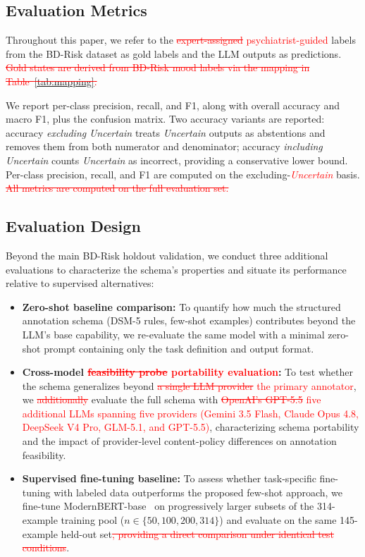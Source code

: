 \documentclass[runningheads]{llncs}
\newcommand{\rev}[1]{\textcolor{red}{#1}}
\newcommand{\del}[1]{\textcolor{red}{\sout{#1}}}
\newcommand{\rev}[1]{#1}
\newcommand{\del}[1]{}
\begin{document}
\subsection{Evaluation Metrics}
\label{sec:metrics}

Throughout this paper, we refer to the \del{expert-assigned} \rev{psychiatrist-guided} labels from the BD-Risk dataset as gold labels and the LLM outputs as predictions.\del{ Gold states are derived from BD-Risk mood labels via the mapping in Table~\ref{tab:mapping}.}

We report per-class precision, recall, and F1, along with overall accuracy and macro F1, plus the confusion matrix. Two accuracy variants are reported: accuracy \emph{excluding} \emph{Uncertain} treats \emph{Uncertain} outputs as abstentions and removes them from both numerator and denominator; accuracy \emph{including} \emph{Uncertain} counts \emph{Uncertain} as incorrect, providing a conservative lower bound. Per-class precision, recall, and F1 are computed on the excluding-\rev{\emph{Uncertain}} basis.\del{ All metrics are computed on the full evaluation set.}

\subsection{Evaluation Design}
\label{sec:evaldesign}

Beyond the main BD-Risk holdout validation, we conduct three additional evaluations to characterize the schema's properties and situate its performance relative to supervised alternatives:

\begin{itemize}
\item \textbf{Zero-shot baseline comparison:} To quantify how much the structured annotation schema (DSM-5 rules, few-shot examples) contributes beyond the LLM's base capability, we re-evaluate the same model with a minimal zero-shot prompt containing only the task definition and output format.
\item \textbf{Cross-model \del{feasibility probe} \rev{portability evaluation}:} To test whether the schema generalizes beyond \del{a single LLM provider} \rev{the primary annotator}, we \del{additionally} evaluate the full schema with \del{OpenAI's GPT-5.5} \rev{five additional LLMs spanning five providers (Gemini 3.5 Flash, Claude Opus 4.8, DeepSeek V4 Pro, GLM-5.1, and GPT-5.5)}, characterizing schema portability and the impact of provider-level content-policy differences on annotation feasibility.
\item \textbf{Supervised fine-tuning baseline:} To assess whether task-specific fine-tuning with labeled data outperforms the proposed few-shot approach, we fine-tune ModernBERT-base~\cite{warner2025modernbert} on progressively larger subsets of the 314-example training pool ($n \in \{50, 100, 200, 314\}$) and evaluate on the same 145-example held-out set\del{, providing a direct comparison under identical test conditions}.
\end{itemize}
\end{document}
